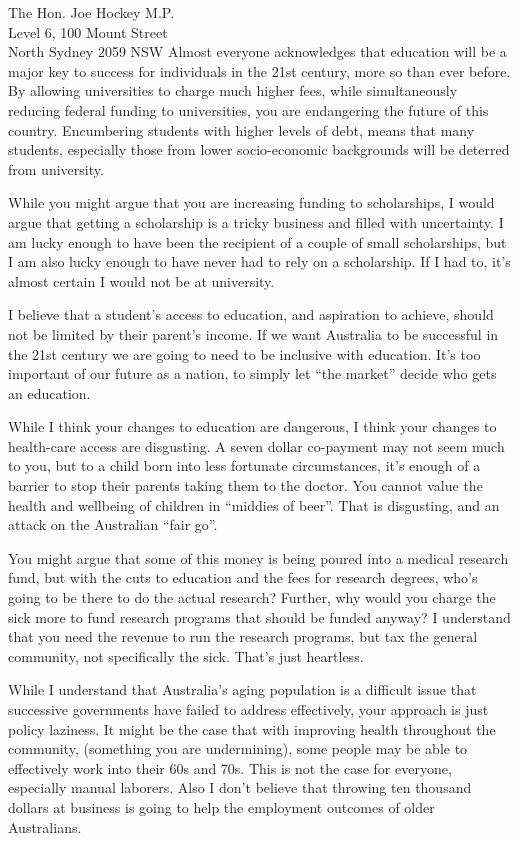 \documentclass{letter}
\begin{document}
\begin{letter}{The Hon. Joe Hockey M.P. \\ Level 6, 100 Mount Street \\ North Sydney 2059 NSW }
Almost everyone acknowledges that education will be a major key to success for individuals
in the 21st century, more so than ever before. By allowing universities to charge much higher fees,
while simultaneously reducing federal funding to universities, you are endangering the 
future of this country. Encumbering students with higher levels of debt, means that many 
students, especially those from lower socio-economic backgrounds will be deterred from university.

While you might argue that you are increasing funding to scholarships, I would argue that 
getting a scholarship is a tricky business and filled with uncertainty. I am lucky enough to
have been the recipient of a couple of small scholarships, but I am also lucky enough to have never
had to rely on a scholarship. If I had to, it's almost certain I would not be at university.

I believe that a student's access to education, and aspiration to achieve, should not
be limited by their parent's income. If we want Australia to be successful in the 21st century
we are going to need to be inclusive with education. It's too important of our future as a nation,
to simply let ``the market'' decide who gets an education.

While I think your changes to education are dangerous, I think your changes to health-care access
are disgusting. A seven dollar co-payment may not seem much to you, but to a child 
born into less fortunate circumstances, it's enough of a barrier to stop their parents taking
them to the doctor. You cannot value the health and wellbeing of children in ``middies of beer''.
That is disgusting, and an attack on the Australian ``fair go''.

You might argue that some of this money is being poured into a medical research fund, 
but with the cuts to education and the fees for research degrees,
who's going to be there to do the actual research? Further, why would you charge the sick more
to fund research programs that should be funded anyway? I understand that you need the 
revenue to run the research programs, but tax the general community, not specifically the sick. 
That's just heartless.

While I understand that Australia's aging population is a difficult issue that successive governments
have failed to address effectively, your approach is just policy laziness. It might be the case that with
improving health throughout the community, (something you are undermining), some people may be able
to effectively work into their 60s and 70s. This is not the case for everyone, especially manual
laborers. Also I don't believe that throwing ten thousand dollars at business is going to 
help the employment outcomes of older Australians.  


\end{letter}
\end{document}
